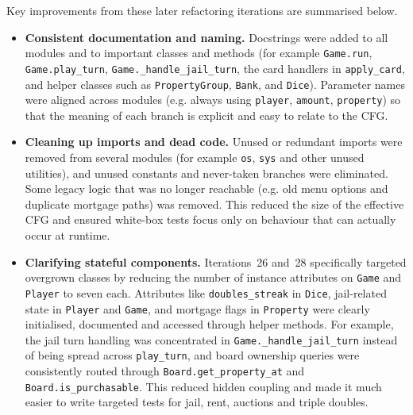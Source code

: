 \documentclass[11pt]{article}
\begin{document}
Key improvements from these later refactoring iterations are summarised below.

\begin{itemize}
  \item \textbf{Consistent documentation and naming.}  Docstrings were added to all modules and to important classes and methods (for example \texttt{Game.run}, \texttt{Game.play\_turn}, \texttt{Game.\_handle\_jail\_turn}, the card handlers in \texttt{apply\_card}, and helper classes such as \texttt{PropertyGroup}, \texttt{Bank}, and \texttt{Dice}).  Parameter names were aligned across modules (e.g. always using \texttt{player}, \texttt{amount}, \texttt{property}) so that the meaning of each branch is explicit and easy to relate to the CFG.

  \item \textbf{Cleaning up imports and dead code.}  Unused or redundant imports were removed from several modules (for example \texttt{os}, \texttt{sys} and other unused utilities), and unused constants and never-taken branches were eliminated.  Some legacy logic that was no longer reachable (e.g. old menu options and duplicate mortgage paths) was removed.  This reduced the size of the effective CFG and ensured white-box tests focus only on behaviour that can actually occur at runtime.

  \item \textbf{Clarifying stateful components.}  Iterations~26 and~28 specifically targeted overgrown classes by reducing the number of instance attributes on \texttt{Game} and \texttt{Player} to seven each.  Attributes like \texttt{doubles\_streak} in \texttt{Dice}, jail-related state in \texttt{Player} and \texttt{Game}, and mortgage flags in \texttt{Property} were clearly initialised, documented and accessed through helper methods.  For example, the jail turn handling was concentrated in \texttt{Game.\_handle\_jail\_turn} instead of being spread across \texttt{play\_turn}, and board ownership queries were consistently routed through \texttt{Board.get\_property\_at} and \texttt{Board.is\_purchasable}.  This reduced hidden coupling and made it much easier to write targeted tests for jail, rent, auctions and triple doubles.


\end{itemize}
\end{document}
